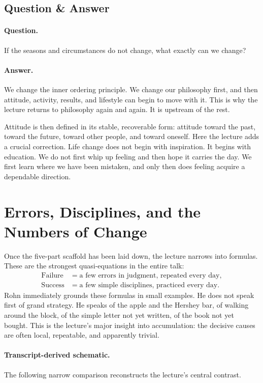 \subsection{Question \& Answer}

\paragraph{Question.} If the seasons and circumstances do not change, what exactly can we change?

\paragraph{Answer.} We change the inner ordering principle. We change our philosophy first, and then attitude, activity, results, and lifestyle can begin to move with it. This is why the lecture returns to philosophy again and again. It is upstream of the rest.

Attitude is then defined in its stable, recoverable form: attitude toward the past, toward the future, toward other people, and toward oneself. Here the lecture adds a crucial correction. Life change does not begin with inspiration. It begins with education. We do not first whip up feeling and then hope it carries the day. We first learn where we have been mistaken, and only then does feeling acquire a dependable direction.

\section{Errors, Disciplines, and the Numbers of Change}

Once the five-part scaffold has been laid down, the lecture narrows into formulas. These are the strongest quasi-equations in the entire talk:
\begin{align}
\mathrm{Failure} &= \text{a few errors in judgment, repeated every day},\\
\mathrm{Success} &= \text{a few simple disciplines, practiced every day}.
\end{align}
Rohn immediately grounds these formulas in small examples. He does not speak first of grand strategy. He speaks of the apple and the Hershey bar, of walking around the block, of the simple letter not yet written, of the book not yet bought. This is the lecture's major insight into accumulation: the decisive causes are often local, repeatable, and apparently trivial.

\paragraph{Transcript-derived schematic.} The following narrow comparison reconstructs the lecture's central contrast.

